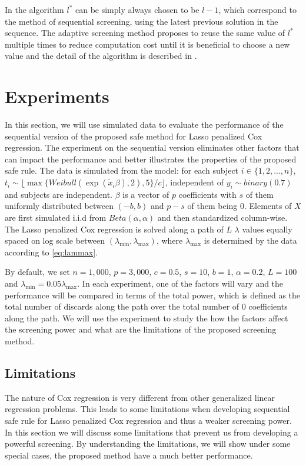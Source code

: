 In the algorithm $l^*$ can be simply always chosen to be $l-1$, which correspond to the method of sequential screening, using the latest previous solution in the sequence. The adaptive screening method proposes to reuse the same value of $l^*$ multiple times to reduce computation cost until it is beneficial to choose a new value and the detail of the algorithm is described in \citep{wang2021adaptive}.

\section{Experiments}

In this section, we will use simulated data to evaluate the performance of the sequential version of the proposed safe method for Lasso penalized Cox regression. The experiment on the sequential version eliminates other factors that can impact the performance and better illustrates the properties of the proposed safe rule. The data is simulated from the model: for each subject $i\in\{1,2,...,n\}$, $t_i\sim \lfloor\max\{Weibull(\exp(\tilde{x}_i\beta),2), 5\}/c\rfloor $, independent of $y_i\sim binary(0.7)$ and subjects are independent. $\beta$ is a vector of $p$ coefficients with $s$ of them uniformly distributed between $(-b,b)$ and $p-s$ of them being $0$. Elements of $X$ are first simulated i.i.d from $Beta(\alpha,\alpha)$ and then standardized column-wise. The Lasso penalized Cox regression is solved along a path of $L$ $\lambda$ values equally spaced on log scale between $(\lambda_{\min},\lambda_{\max})$, where $\lambda_{\max}$ is determined by the data according to \eqref{eq:lammax}. 

By default, we set $n=1,000$, $p=3,000$, $c=0.5$, $s=10$, $b=1$, $\alpha=0.2$, $L=100$ and $\lambda_{\min}=0.05\lambda_{\max}$. In each experiment, one of the factors will vary and the performance will be compared in terms of the total power, which is defined as the total number of discards along the path over the total number of 0 coefficients along the path. We will use the experiment to study the how the factors affect the screening power and what are the limitations of the proposed screening method.

\subsection{Limitations}
\label{sec:lim}


The nature of Cox regression is very different from other generalized linear regression problems. This leads to some limitations when developing sequential safe rule for Lasso penalized Cox regression and thus a weaker screening power. In this section we will discuss some limitations that prevent us from developing a powerful screening. By understanding the limitations, we will show under some special cases, the proposed method have a much better performance.


